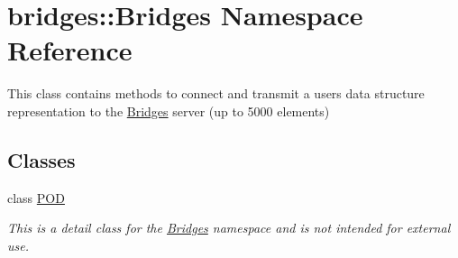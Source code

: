 \hypertarget{namespacebridges_1_1_bridges}{}\section{bridges\+:\+:Bridges Namespace Reference}
\label{namespacebridges_1_1_bridges}


This class contains methods to connect and transmit a user\textquotesingle{}s data structure representation to the \hyperlink{namespacebridges_1_1_bridges}{Bridges} server (up to 5000 elements)  


\subsection*{Classes}
\begin{DoxyCompactItemize}
\item 
class \hyperlink{classbridges_1_1_bridges_1_1_p_o_d}{P\+O\+D}
\begin{DoxyCompactList}\small\item\em This is a detail class for the \hyperlink{namespacebridges_1_1_bridges}{Bridges} namespace and is not intended for external use. \end{DoxyCompactList}\end{DoxyCompactItemize}
